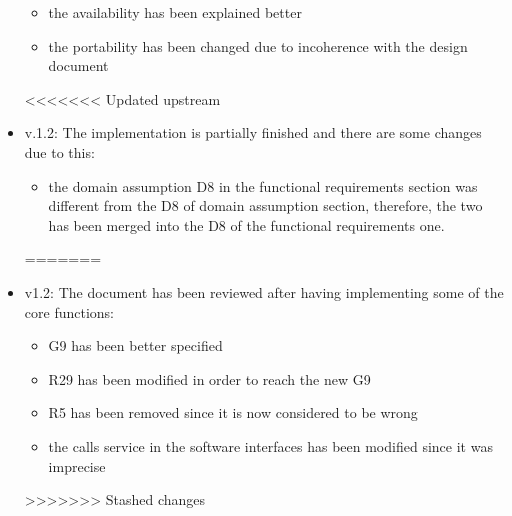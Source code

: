 \begin{itemize}
\begin{itemize}
	\item the availability has been explained better
	\item the portability has been changed due to incoherence with the design document
	\end{itemize}
<<<<<<< Updated upstream
\item v.1.2: The implementation is partially finished and there are some changes due to this:
\begin{itemize}
	\item the domain assumption D8 in the functional requirements section was different from the D8 of domain assumption section, therefore, the two has been merged into the D8 of the functional requirements one.
\end{itemize}
=======
\item v1.2: The document has been reviewed after having implementing some of the
core functions: 
	\begin{itemize}
	\item G9 has been better specified 
	\item R29 has been modified in order to reach the new G9
	\item R5 has been removed since it is now considered to be wrong
	\item the calls service in the software interfaces has been modified since 
	it was imprecise
	\end{itemize}		
>>>>>>> Stashed changes
\end{itemize}